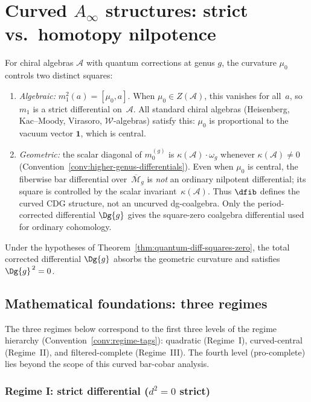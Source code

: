 \section{\texorpdfstring{Curved $A_\infty$ structures: strict vs.\ homotopy nilpotence}{Curved A-infinity structures: strict vs homotopy nilpotence}}
\label{sec:strict-vs-homotopy}

For chiral algebras $\mathcal{A}$ with quantum corrections at genus $g$,
the curvature $\mu_0$ controls two distinct squares:
\begin{enumerate}[label=\textup{(\roman*)}]
\item \emph{Algebraic:}\; $m_1^2(a) = [\mu_0, a]$.
 When $\mu_0 \in Z(\mathcal{A})$, this vanishes for all~$a$, so $m_1$ is a strict differential on~$\mathcal{A}$. All standard chiral algebras (Heisenberg, Kac--Moody, Virasoro, $\mathcal{W}$-algebras) satisfy this: $\mu_0$ is proportional to the vacuum vector $\mathbf{1}$, which is central.
\item \emph{Geometric:}\; the scalar diagonal of $m_0^{(g)}$ is $\kappa(\mathcal{A})\cdot\omega_g$ whenever $\kappa(\mathcal{A}) \neq 0$
 (Convention~\ref{conv:higher-genus-differentials}).
 Even when $\mu_0$ is central, the fiberwise bar differential over~$\overline{\mathcal{M}}_g$ is \emph{not} an ordinary nilpotent differential; its square is controlled by the scalar invariant~$\kappa(\mathcal{A})$.
 Thus $\dfib$ defines the curved CDG structure, not an uncurved
 dg-coalgebra. Only the period-corrected differential $\Dg{g}$ gives
 the square-zero coalgebra differential used for ordinary cohomology.
\end{enumerate}
Under the hypotheses of Theorem~\ref{thm:quantum-diff-squares-zero},
the total corrected differential $\Dg{g}$ absorbs the geometric
curvature and satisfies $\Dg{g}^{\,2} = 0$.

\subsection{Mathematical foundations: three regimes}
\label{subsec:three-regimes}

The three regimes below correspond to the first three levels of the
regime hierarchy (Convention~\ref{conv:regime-tags}): quadratic
(Regime~I), curved-central (Regime~II), and filtered-complete
(Regime~III). The fourth level (pro-complete) lies beyond the
scope of this curved bar-cobar analysis.

\subsubsection{\texorpdfstring{Regime I: strict differential ($d^2 = 0$ strict)}{Regime I: strict differential (d2 = 0 strict)}}
\label{def:strict-dg}

